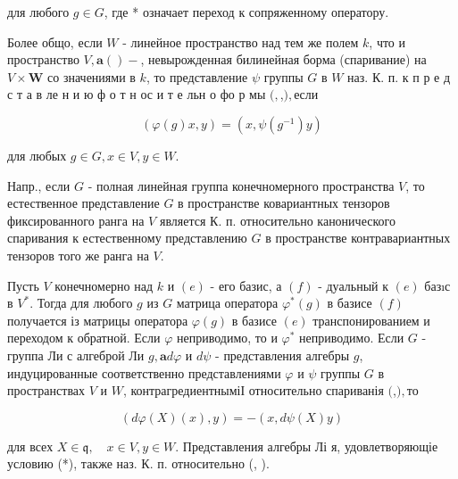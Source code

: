 \documentclass[10pt]{article}
\begin{document}
для любого $g \in G$, где * означает переход к сопряженному оператору.



Более общо, если $W$ - линейное пространство над тем же полем $k$, что и пространство $V, \mathbf{a}()-$, невырожденная билинейная борма (спаривание) на $V \times \boldsymbol{W}$ со значениями в $k$, то представление $\psi$ группы $G$ в $W$ наз. К. п. к п р е д с т а в ле н и ю $ф$ о т н ос и т е льн о фо р мы $(,$,$) , если$



\[

(\varphi(g) x, y)=\left(x, \psi\left(g^{-1}\right) y\right)

\]



для любых $g \in G, x \in V, y \in W$.



Напр., если $G$ - полная линейная группа конечномерного пространства $V$, то естественное представление $G$ в пространстве ковариантных тензоров фиксированного ранга на $V$ является К. п. относительно канонического спаривания к естественному представлению $G$ в пространстве контравариантных тензоров того же ранга на $V$.



Пусть $V$ конечномерно над $k$ и $(e)$ - его базис, а $(f)$ - дуальный к $(e)$ базıс в $V^{*}$. Тогда для любого $g$ из $G$ матрица оператора $\varphi^{*}(g)$ в базисе $(f)$ получается із матрицы оператора $\varphi(g)$ в базисе $(e)$ транспонированием и переходом к обратной. Если $\varphi$ неприводимо, то и $\varphi^{*}$ неприводимо. Если $G$ - группа Ли с алгеброй Ли $g, \mathbf{a} d \varphi$ и $d \psi$ - представления алгебры $g$, индуцированные соответственно представлениями $\varphi$ и $\psi$ группы $G$ в пространствах $V$ и $W$, контрагредиентныміІ относительно спариванія $($,$) , то$



\[

(d \varphi(X)(x), y)=-(x, d \psi(X) y)

\]



для всех $X \in \mathfrak{q}, \quad x \in V, y \in W$. Представления алгебры Лі я, удовлетворяющіе условию (*), также наз. К. п. относительно (, ).
\end{document}
